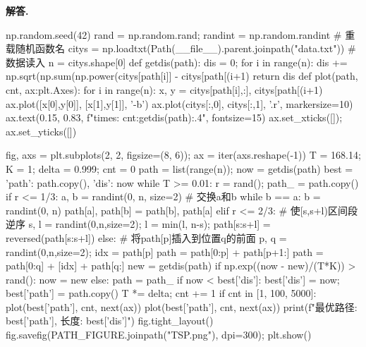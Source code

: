 \documentclass[12pt, a4paper, oneside]{ctexart}
\newenvironment{solution}[1][]{\par\noindent\textbf{#1解答. }}{\smallskip\par}  %
\begin{document}
\begin{solution}
\begin{pythoncode}
np.random.seed(42)
rand = np.random.rand; randint = np.random.randint  # 重载随机函数名
citys = np.loadtxt(Path(__file__).parent.joinpath("data.txt"))  # 数据读入
n = citys.shape[0]
def getdis(path):
    dis = 0;
    for i in range(n):
        dis += np.sqrt(np.sum(np.power(citys[path[i]] - citys[path[(i+1)%
    return dis
def plot(path, cnt, ax:plt.Axes):
    for i in range(n):
        x, y = citys[path[i],:], citys[path[(i+1)%
        ax.plot([x[0],y[0]], [x[1],y[1]], '-b')
    ax.plot(citys[:,0], citys[:,1], '.r', markersize=10)
    ax.text(0.15, 0.83, f"times: {cnt}\ndistence:{getdis(path):.4}", fontsize=15)
    ax.set_xticks([]); ax.set_yticks([])

fig, axs = plt.subplots(2, 2, figsize=(8, 6)); ax = iter(axs.reshape(-1))
T = 168.14; K = 1; delta = 0.999; cnt = 0
path = list(range(n)); now = getdis(path)
best = {'path': path.copy(), 'dis': now}
while T >= 0.01:
    r = rand(); path_ = path.copy()
    if r <= 1/3:
        a, b = randint(0, n, size=2)  # 交换a和b
        while b == a: b = randint(0, n)
        path[a], path[b] = path[b], path[a]
    elif r <= 2/3:  # 使[s,s+l)区间段逆序
        s, l = randint(0,n,size=2); l = min(l, n-s); path[s:s+l] = reversed(path[s:s+l])
    else:  # 将path[p]插入到位置q的前面
        p, q = randint(0,n,size=2); idx = path[p]
        path = path[0:p] + path[p+1:]
        path = path[0:q] + [idx] + path[q:]
    new = getdis(path)
    if np.exp((now - new)/(T*K)) > rand(): now = new
    else: path = path_
    if now < best['dis']: best['dis'] = now; best['path'] = path.copy()
    T *= delta; cnt += 1
    if cnt in [1, 100, 5000]: plot(best['path'], cnt, next(ax))
plot(best['path'], cnt, next(ax))
print(f"最优路径: {best['path']}, 长度: {best['dis']}")
fig.tight_layout()
fig.savefig(PATH_FIGURE.joinpath("TSP.png"), dpi=300); plt.show()
\end{pythoncode}
\end{solution}
\end{document}
